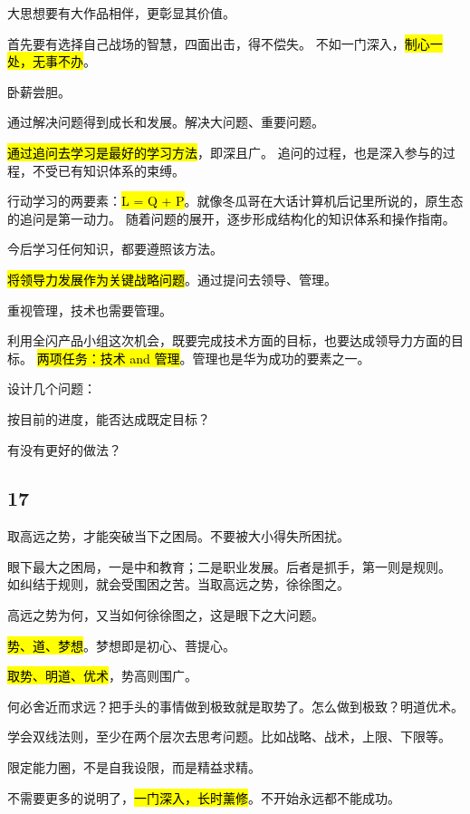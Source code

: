 大思想要有大作品相伴，更彰显其价值。

首先要有选择自己战场的智慧，四面出击，得不偿失。
不如一门深入，\hl{制心一处，无事不办}。

卧薪尝胆。

通过解决问题得到成长和发展。解决大问题、重要问题。

\hl{通过追问去学习是最好的学习方法}，即深且广。
追问的过程，也是深入参与的过程，不受已有知识体系的束缚。

行动学习的两要素：\hl{L = Q + P}。就像冬瓜哥在大话计算机后记里所说的，原生态的追问是第一动力。
随着问题的展开，逐步形成结构化的知识体系和操作指南。

今后学习任何知识，都要遵照该方法。

\hrulefill

\hl{将领导力发展作为关键战略问题}。通过提问去领导、管理。

重视管理，技术也需要管理。

利用全闪产品小组这次机会，既要完成技术方面的目标，也要达成领导力方面的目标。
\hl{两项任务：技术 and 管理}。管理也是华为成功的要素之一。

设计几个问题：
\begin{enumbox}
\item 按目前的进度，能否达成既定目标？
\item 有没有更好的做法？
\end{enumbox}

\subsection{17}

取高远之势，才能突破当下之困局。不要被大小得失所困扰。

眼下最大之困局，一是中和教育；二是职业发展。后者是抓手，第一则是规则。
如纠结于规则，就会受围困之苦。当取高远之势，徐徐图之。

高远之势为何，又当如何徐徐图之，这是眼下之大问题。

\hl{势、道、梦想}。梦想即是初心、菩提心。

\hrullfill

\hl{取势、明道、优术}，势高则围广。

何必舍近而求远？把手头的事情做到极致就是取势了。怎么做到极致？明道优术。

学会双线法则，至少在两个层次去思考问题。比如战略、战术，上限、下限等。

限定能力圈，不是自我设限，而是精益求精。

不需要更多的说明了，\hl{一门深入，长时薰修}。不开始永远都不能成功。

